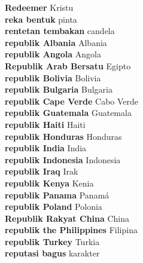 \textbf{ Redeemer  } Kristu \\
\textbf{ reka bentuk  } pinta \\
\textbf{ rentetan tembakan  } candela \\
\textbf{ republik Albania  } Albania \\
\textbf{ republik Angola  } Angola \\
\textbf{ Republik Arab Bersatu  } Egipto \\
\textbf{ republik Bolivia  } Bolivia \\
\textbf{ republik Bulgaria  } Bulgaria \\
\textbf{ republik Cape Verde  } Cabo Verde \\
\textbf{ republik Guatemala  } Guatemala \\
\textbf{ republik Haiti  } Haiti \\
\textbf{ republik Honduras  } Honduras \\
\textbf{ republik India  } India \\
\textbf{ republik Indonesia  } Indonesia \\
\textbf{ republik Iraq  } Irak \\
\textbf{ republik Kenya  } Kenia \\
\textbf{ republik Panama  } Panamá \\
\textbf{ republik Poland  } Polonia \\
\textbf{ Republik Rakyat China  } China \\
\textbf{ republik the Philippines  } Filipina \\
\textbf{ republik Turkey  } Turkia \\
\textbf{ reputasi bagus  } karakter \\
